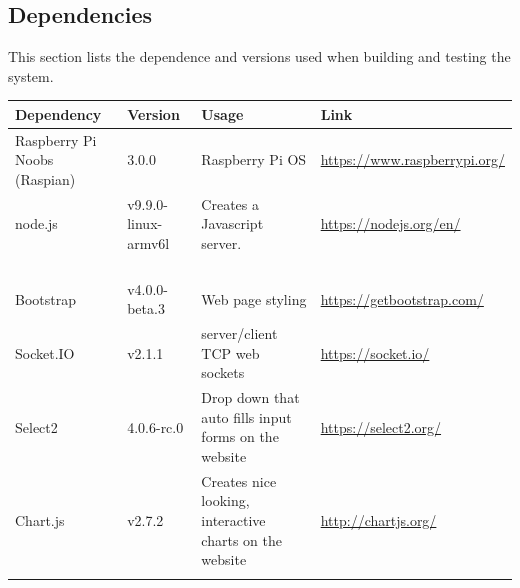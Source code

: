 \documentclass[12pt]{article}
\begin{document}
\subsection{Dependencies}
This section lists the dependence and versions used when building and testing the system.\\
\begin{center}
	\begin{tabularx}{\textwidth}{ |X|X|X|X| }
		\hline
		\textbf{Dependency} & \textbf{Version} & \textbf{Usage} & \textbf{Link}\\ 
		\hline
		Raspberry Pi Noobs (Raspian) & 3.0.0 & Raspberry Pi OS & \url{https://www.raspberrypi.org/}\\ 
		\hline
		node.js & v9.9.0-linux-armv6l & Creates a Javascript server. & \url{https://nodejs.org/en/}\\ 
		\hline
		 &  &  & \url{}\\ 
		\hline
		 &  &  & \url{}\\ 
		\hline
		 &  &  & \url{}\\ 
		\hline
		 &  &  & \url{}\\ 
		\hline
		Bootstrap & v4.0.0-beta.3 & Web page styling & \url{https://getbootstrap.com/}\\ 
		\hline
		Socket.IO & v2.1.1 & server/client TCP web sockets & \url{https://socket.io/}\\ 
		\hline
		Select2 & 4.0.6-rc.0 & Drop down that auto fills input forms on the website & \url{https://select2.org/}\\ 
		\hline
		Chart.js & v2.7.2 & Creates nice looking, interactive charts on the website & \url{http://chartjs.org/}\\ 
		\hline
		 &  &  & \url{}\\ 
		\hline
		
		
		  
	\end{tabularx}
\end{center}
\end{document}
